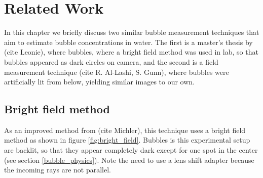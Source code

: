 \chapter{Related Work} \label{related_work}
 

In this chapter we briefly discuss two similar bubble measurement techniques that aim to estimate bubble concentrations in water. The first is a master's thesis by (cite Leonie), where bubbles, where a bright field method was used in lab, so that bubbles appeared as dark circles on camera, and the second is a field measurement technique (cite R. Al-Lashi, S. Gunn), where bubbles were artificially lit from below, yielding similar images to our own. 

\section{Bright field method}
	As an improved method from (cite Michler), this technique uses a bright field method as shown in figure \ref{fig:bright_field}. Bubbles is this experimental setup are backlit, so that they appear completely dark except for one spot in the center (see section  \ref{bubble_physics}). Note the need to use a lens shift adapter because the incoming rays are not parallel. 
	
